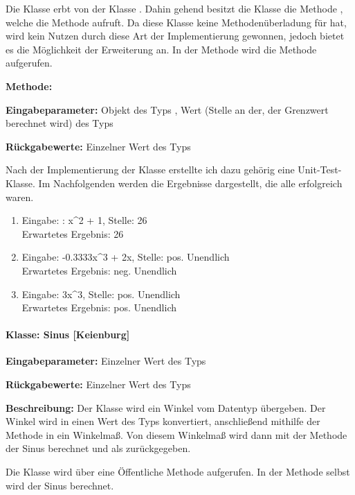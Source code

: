Die Klasse  erbt von der Klasse . Dahin gehend besitzt die Klasse die Methode , welche die Methode  aufruft. Da diese Klasse keine Methodenüberladung für  hat, wird kein Nutzen durch diese Art der Implementierung gewonnen, jedoch bietet es die Möglichkeit der Erweiterung an. In der Methode  wird die Methode  aufgerufen.

\textbf{Methode:} 

\textbf{Eingabeparameter: }Objekt des Typs , Wert (Stelle an der, der Grenzwert berechnet wird) des Typs 

\textbf{Rückgabewerte: }Einzelner Wert des Typs 

Nach der Implementierung der Klasse erstellte ich dazu gehörig eine Unit-Test-Klasse. Im Nachfolgenden werden die Ergebnisse dargestellt, die alle erfolgreich waren.

\begin{enumerate}
	\item Eingabe: : x\^{}2 + 1, Stelle: 26 \\
	Erwartetes Ergebnis: 26 
	\item Eingabe: -0.3333x\^{}3 + 2x, Stelle: pos. Unendlich \\
	Erwartetes Ergebnis: neg. Unendlich
	\item Eingabe: 3x\^{}3, Stelle: pos. Unendlich \\
	Erwartetes Ergebnis: pos. Unendlich
\end{enumerate}

\paragraph{Klasse: Sinus [Keienburg]}
\textbf{Eingabeparameter: } Einzelner Wert des Typs 

\textbf{Rückgabewerte: } Einzelner Wert des Typs 

\textbf{Beschreibung: } Der Klasse wird ein Winkel vom Datentyp  übergeben. Der Winkel wird in einen Wert des Typs  konvertiert, anschließend mithilfe der Methode  in ein Winkelmaß. Von diesem Winkelmaß wird dann mit der Methode  der Sinus berechnet und als  zurückgegeben.  

Die Klasse wird über eine Öffentliche Methode aufgerufen. In der Methode selbst wird der Sinus berechnet. 

